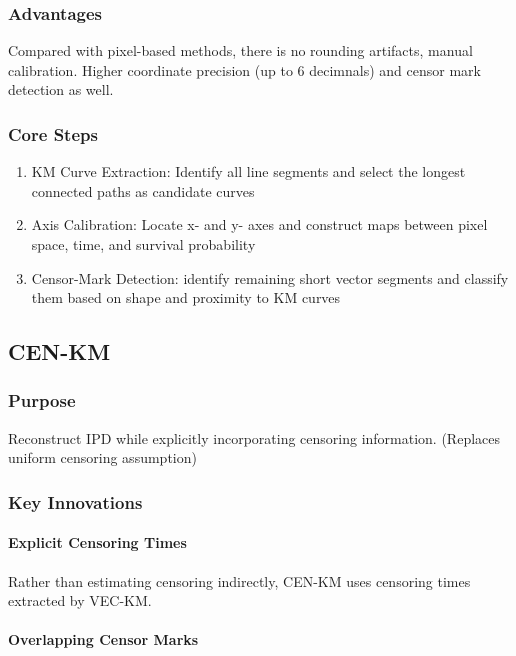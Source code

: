 \documentclass[11pt]{article}
\begin{document}
\subsubsection*{Advantages}

Compared with pixel-based methods, there is no rounding artifacts, manual calibration. Higher coordinate precision (up to 6 decimnals) and censor mark detection as well.

\subsubsection*{Core Steps}
\begin{enumerate}
    \item KM Curve Extraction: Identify all line segments and select the longest connected paths as candidate curves
    \item Axis Calibration: Locate x- and y- axes and construct maps between pixel space, time, and survival probability
    \item Censor-Mark Detection: identify remaining short vector segments and classify them based on shape and proximity to KM curves
\end{enumerate}

\subsection*{CEN-KM}

\subsubsection*{Purpose}

Reconstruct IPD while explicitly incorporating censoring information. (Replaces uniform censoring assumption)

\subsubsection*{Key Innovations}

\paragraph{Explicit Censoring Times}

Rather than estimating censoring indirectly, CEN-KM uses censoring times extracted by VEC-KM.

\paragraph{Overlapping Censor Marks}
\end{document}
